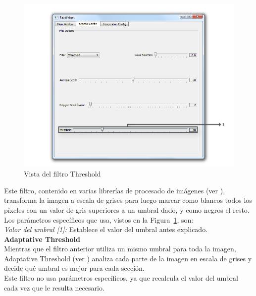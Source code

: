 		\begin{figure}[htbp]
		\centering
		\hspace*{-0.9in}
		\includegraphics[scale=0.57]{graphics/interfazthreshold.png}
		\caption{Vista del filtro Threshold}
		\label{fig:interfazthreshold}
		\end{figure}
		
		Este filtro, contenido en varias librerías de procesado de imágenes (ver \cite{opencvDoc}), transforma la imagen a escala de grises para luego marcar como blancos todos los píxeles con un valor de gris superiores a un umbral dado, y como negros el resto.\\
		
		Los parámetros específicos que usa, vistos en la Figura~\ref{fig:interfazthreshold}, son:\\		
		
		\noindent\textit{Valor del umbral [1]:} Establece el valor del umbral antes explicado.\\
		
	\noindent\textbf{Adaptative Threshold}\\

		Mientras que el filtro anterior utiliza un mismo umbral para toda la imagen, Adaptative Threshold (ver \cite{opencvDoc}) analiza cada parte de la imagen en escala de grises y decide qué umbral es mejor para cada sección.\\ 
		
		Este filtro no usa parámetros específicos, ya que recalcula el valor del umbral cada vez que le resulta necesario.\\
		
